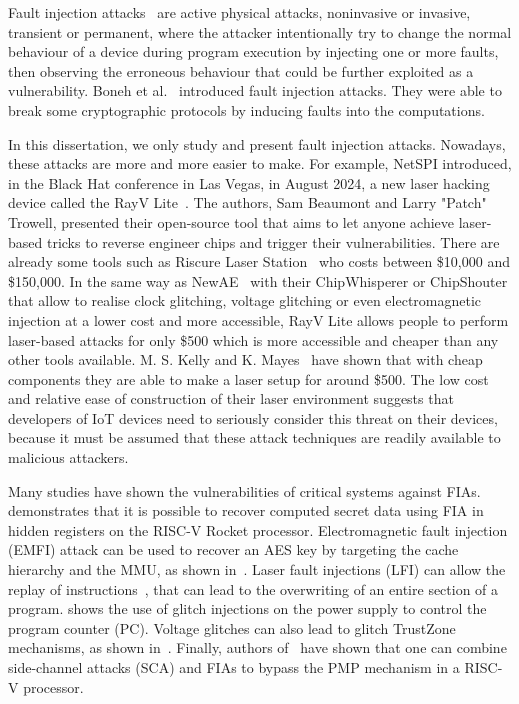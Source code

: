 Fault injection attacks~\cite{BCNTW-06-procieee, BBKN-12-procieee, YSW-18-hss} are active physical attacks, noninvasive or invasive, transient or permanent, where the attacker intentionally try to change the normal behaviour of a device during program execution by injecting one or more faults, then observing the erroneous behaviour that could be further exploited as a vulnerability. Boneh et al.~\cite{BDL-97-eurocrypt} introduced fault injection attacks. They were able to break some cryptographic protocols by inducing faults into the computations.

In this dissertation, we only study and present fault injection attacks. Nowadays, these attacks are more and more easier to make. For example, NetSPI introduced, in the Black Hat conference in Las Vegas, in August 2024, a new laser hacking device called the RayV Lite~\cite{rayvlite_wired}. The authors, Sam Beaumont and Larry "Patch" Trowell, presented their open-source tool that aims to let anyone achieve laser-based tricks to reverse engineer chips and trigger their vulnerabilities. There are already some tools such as Riscure Laser Station~\cite{riscure_station} who costs between \$10,000 and \$150,000. In the same way as NewAE~\cite{chipwhisperer, chipshouter} with their ChipWhisperer or ChipShouter that allow to realise clock glitching, voltage glitching or even electromagnetic injection at a lower cost and more accessible, RayV Lite allows people to perform laser-based attacks for only \$500 which is more accessible and cheaper than any other tools available. M. S. Kelly and K. Mayes~\cite{KM-20-host} have shown that with cheap components they are able to make a laser setup for around \$500. The low cost and relative ease of construction of their laser environment suggests that developers of IoT devices need to seriously consider this threat on their devices, because it must be assumed that these attack techniques are readily available to malicious attackers.

Many studies have shown the vulnerabilities of critical systems against FIAs.
\cite{LBDP-19-date} demonstrates that it is possible to recover computed secret data using FIA in hidden registers on the RISC-V Rocket processor. 
Electromagnetic fault injection (EMFI) attack can be used to recover an AES key by targeting the cache hierarchy and the MMU, as shown in~\cite{TBELB-21-jce}.
Laser fault injections (LFI) can allow the replay of instructions~\cite{KDD-21-dsd}, that can lead to the overwriting of an entire section of a program.
\cite{TSW-16-fdtc} shows the use of glitch injections on the power supply to control the program counter (PC). Voltage glitches can also lead to glitch TrustZone mechanisms, as shown in~\cite{SMS-23-usenix}.
Finally, authors of~\cite{NSUH-21-tches} have shown that one can combine side-channel attacks (SCA) and FIAs to bypass the PMP mechanism in a RISC-V processor.

